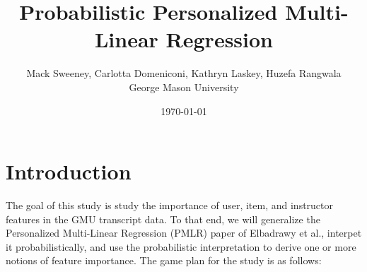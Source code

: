 \documentclass[10pt]{proc}
\title{Probabilistic Personalized Multi-Linear Regression}
\author{
    Mack Sweeney, Carlotta Domeniconi, Kathryn Laskey, Huzefa Rangwala\\
        George Mason University
}
\date{\today}
\begin{document}
\maketitle


\begin{abstract}

\end{abstract}


\section{Introduction}

The goal of this study is  study the importance of user, item, and instructor
features in the GMU transcript data. To that end, we will generalize the
Personalized Multi-Linear Regression (PMLR) paper of Elbadrawy et al., interpet
it probabilistically, and use the probabilistic interpretation to derive one or
more notions of feature importance. The game plan for the study is as follows:
\end{document}
